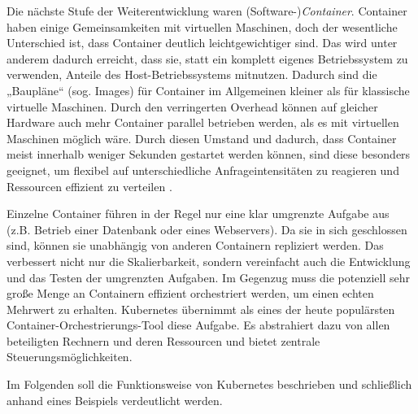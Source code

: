 \documentclass[11pt,a4paper]{article}
\begin{document}
Die nächste Stufe der Weiterentwicklung waren (Software-)\emph{Container}. Container haben einige Gemeinsamkeiten mit virtuellen Maschinen, doch der wesentliche Unterschied ist,
dass Container deutlich leichtgewichtiger sind. Das wird unter anderem dadurch erreicht, dass sie, statt ein komplett eigenes Betriebssystem zu verwenden,
Anteile des Host-Betriebssystems mitnutzen. Dadurch sind die „Baupläne“ (sog. Images) für Container im Allgemeinen kleiner als für klassische virtuelle Maschinen.
Durch den verringerten Overhead können auf gleicher Hardware auch mehr Container parallel betrieben werden, als es mit virtuellen Maschinen möglich wäre.
Durch diesen Umstand und dadurch, dass Container meist innerhalb weniger Sekunden gestartet werden können, sind diese besonders geeignet,
um flexibel auf unterschiedliche Anfrageintensitäten zu reagieren und Ressourcen effizient zu verteilen \cite{kofler2021docker}.

Einzelne Container führen in der Regel nur eine klar umgrenzte Aufgabe aus (z.B. Betrieb einer Datenbank oder eines Webservers). Da sie in sich geschlossen sind,
können sie unabhängig von anderen Containern repliziert werden. Das verbessert nicht nur die Skalierbarkeit, sondern
vereinfacht auch die Entwicklung und das Testen der umgrenzten Aufgaben.
Im Gegenzug muss die potenziell sehr große Menge an Containern effizient orchestriert werden, um einen echten Mehrwert zu erhalten.
Kubernetes übernimmt als eines der heute populärsten Container-Orchestrierungs-Tool diese Aufgabe.
Es abstrahiert dazu von allen beteiligten Rechnern und deren Ressourcen und bietet zentrale Steuerungsmöglichkeiten.
\cite{Pagani_2019}



Im Folgenden soll die Funktionsweise von Kubernetes beschrieben und schließlich anhand eines Beispiels
verdeutlicht werden.
\end{document}
